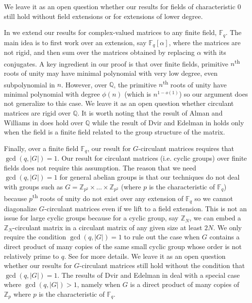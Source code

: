 \documentclass{toc}
\newcommand\F{{\mathbb{F}}}
\renewcommand\Q{{\mathbb{Q}}}
\renewcommand\Z{{\mathbb{Z}}}
\newcommand{\ts}{\textsuperscript}
\begin{document}
%
%
%
%
%
We leave it as an open question whether our results for fields of characteristic $0$ still hold without field extensions or for extensions of lower degree.

In  we  
extend our results for complex-valued matrices to any finite field, $\F_q$.  The main idea is to first work over an extension, say $\F_q[\alpha]$, where the matrices are not rigid, and then sum over the matrices obtained by replacing $\alpha$ with its conjugates.  A key ingredient in our proof is that over finite fields, primitive $n$\ts{th}
roots of unity may have minimal polynomial with very low degree, even subpolynomial in $n$.  However, over $\Q$, the primitive $n$\ts{th} roots of unity have minimal polynomial with degree $\phi(n)$ (which is $n^{1-o(1)}$) so our argument does not generalize to this case.  We leave it as an open question whether
%
%
%
circulant   %
matrices are rigid over $\Q$.  It is worth noting that the result of Alman and Williams in \cite{old_hadamard} does hold over $\Q$ while the result of Dvir and Edelman in \cite{CLP} holds only when the field is a finite field related to the group structure of the matrix.

%
%
%
%


Finally, over a finite field $\F_q$, our result for $G$-circulant matrices requires that $\gcd(q,|G|) = 1$.  Our result for circulant matrices (i.e. cyclic groups) over finite fields does not require this assumption.  The reason that we need $\gcd(q,|G|) = 1$ for general abelian groups is that our techniques do not deal with groups such as $G = \Z_{p^2} \times \dots \times \Z_{p^2}$ (where $p$ is the characteristic of $\F_q$) because $p$\ts{th} roots of unity do not exist over any extension of $\F_q$ so we cannot diagonalize $G$-circulant matrices even if we lift to a field extension.  This is not an issue for large cyclic groups because for a cyclic group, say $\Z_N$, we can embed a $\Z_N$-circulant matrix in a circulant matrix of any given size at least $2N$.  We only require the condition $\gcd(q,|G|) = 1$ to rule out the case when $G$ contains a direct product of many copies of the same small cyclic group whose order is not relatively prime to $q$.  See  for more details.  We leave it as an open question whether our results for $G$-circulant matrices still hold without the condition that $\gcd(q,|G|) = 1$.  The results of Dvir and Edelman in \cite{CLP} deal with a special case where $\gcd(q,|G|) > 1$, namely when $G$ is a direct product of many copies of $\Z_p$ where $p$ is the characteristic of $\F_q$.
\end{document}
